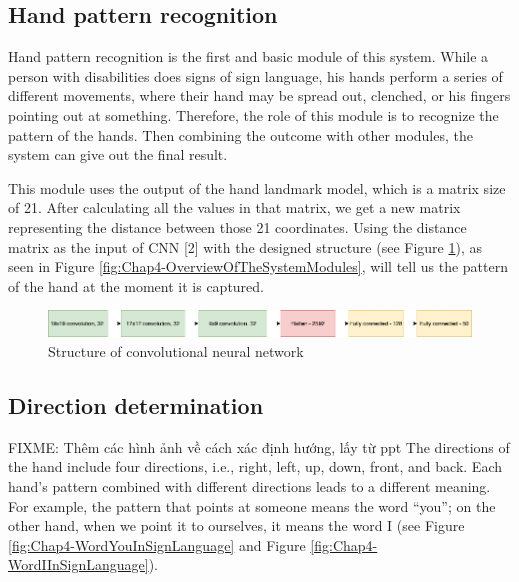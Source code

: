 \subsection{Hand pattern recognition}

Hand pattern recognition is the first and basic module of this system. While a person with disabilities does signs of sign language, his hands perform a series of different movements, where their hand may be spread out, clenched, or his fingers pointing out at something. Therefore, the role of this module is to recognize the pattern of the hands. Then combining the outcome with other modules, the system can give out the final result.

This module uses the output of the hand landmark model, which is a matrix size of 21. After calculating all the values in that matrix, we get a new matrix representing the distance between those 21 coordinates. Using the distance matrix as the input of CNN [2] with the designed structure (see Figure \ref{fig:Chap4-StructureOfConvolutionalNeuralNetwork}), as seen in Figure \ref{fig:Chap4-OverviewOfTheSystemModules}, will tell us the pattern of the hand at the moment it is captured.

\begin{figure}[H]
  \centering
  \includegraphics[width=\textwidth]{img/Chap4/StructureOfConvolutionalNeuralNetwork.png}
  \caption{Structure of convolutional neural network}
  \label{fig:Chap4-StructureOfConvolutionalNeuralNetwork}
\end{figure}

\subsection{Direction determination}
FIXME: Thêm các hình ảnh về cách xác định hướng, lấy từ ppt
The directions of the hand include four directions, i.e., right, left, up, down, front, and back. Each hand’s pattern combined with different directions leads to a different meaning. For example, the pattern that points at someone means the word “you”; on the other hand, when we point it to ourselves, it means the word I (see Figure \ref{fig:Chap4-WordYouInSignLanguage} and Figure \ref{fig:Chap4-WordIInSignLanguage}).

